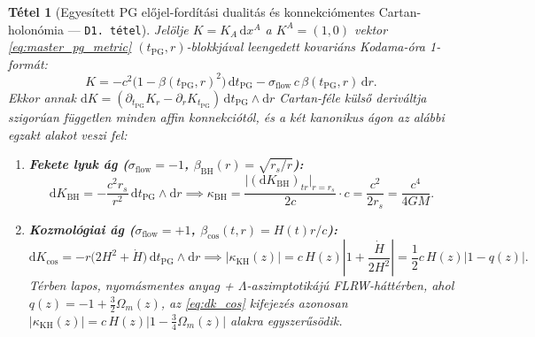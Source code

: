 \documentclass[11pt,a4paper]{article}
\newtheorem{theorem}{T\'etel}[section]
\theoremstyle{remark}
\begin{document}
\begin{theorem}[Egyes\'itett PG el\H{o}jel-ford\'it\'asi dualit\'as \'es konnekci\'omentes Cartan-holon\'omia --- \texttt{D1.\ t\'etel}]
\label{thm:d1}
Jel\"olje $K = K_A\,\mathrm{d}x^A$ a $K^A = (1, 0)$ vektor \eqref{eq:master_pg_metric} $(t_{\mathrm{PG}}, r)$-blokkj\'aval leengedett kovari\'ans Kodama-\'ora 1-form\'at:
\begin{equation}
  K = -c^2\bigl(1 - \beta(t_{\mathrm{PG}}, r)^2\bigr)\,\mathrm{d}t_{\mathrm{PG}} - \sigma_{\mathrm{flow}}\,c\,\beta(t_{\mathrm{PG}}, r)\,\mathrm{d}r.
  \label{eq:kodama_1form}
\end{equation}
Ekkor annak $\mathrm{d}K = (\partial_{t_{\mathrm{PG}}} K_r - \partial_r K_{t_{\mathrm{PG}}})\,\mathrm{d}t_{\mathrm{PG}} \wedge \mathrm{d}r$ Cartan-f\'ele k\"uls\H{o} deriv\'altja szigor\'uan f\"uggetlen minden affin konnekci\'ot\'ol, \'es a k\'et kanonikus \'agon az al\'abbi egzakt alakot veszi fel:
\begin{enumerate}
  \item \textbf{Fekete lyuk \'ag ($\sigma_{\mathrm{flow}} = -1$, $\beta_{\mathrm{BH}}(r) = \sqrt{r_s/r}$):}
  \begin{equation}
    \mathrm{d}K_{\mathrm{BH}} = -\frac{c^2 r_s}{r^2}\,\mathrm{d}t_{\mathrm{PG}} \wedge \mathrm{d}r \implies \kappa_{\mathrm{BH}} = \frac{\bigl|(\mathrm{d}K_{\mathrm{BH}})_{tr}\bigr|_{r=r_s}}{2c}\cdot c = \frac{c^2}{2r_s} = \frac{c^4}{4GM}.
    \label{eq:dk_bh}
  \end{equation}
  \item \textbf{Kozmol\'ogiai \'ag ($\sigma_{\mathrm{flow}} = +1$, $\beta_{\mathrm{cos}}(t, r) = H(t)r/c$):}
  \begin{equation}
    \mathrm{d}K_{\mathrm{cos}} = -r\bigl(2H^2 + \dot{H}\bigr)\,\mathrm{d}t_{\mathrm{PG}} \wedge \mathrm{d}r \implies \bigl|\kappa_{\mathrm{KH}}(z)\bigr| = c\,H(z)\left|1 + \frac{\dot{H}}{2H^2}\right| = \frac{1}{2}c\,H(z)\bigl|1 - q(z)\bigr|.
    \label{eq:dk_cos}
  \end{equation}
  T\'erben lapos, nyom\'asmentes anyag + $\Lambda$-aszimptotik\'aj\'u FLRW-h\'att\'erben, ahol $q(z) = -1 + \frac{3}{2}\Omega_m(z)$, az \eqref{eq:dk_cos} kifejez\'es azonosan $|\kappa_{\mathrm{KH}}(z)| = c\,H(z)\bigl|1 - \frac{3}{4}\Omega_m(z)\bigr|$ alakra egyszer\H{u}s\"odik.
\end{enumerate}
\end{theorem}
\end{document}
